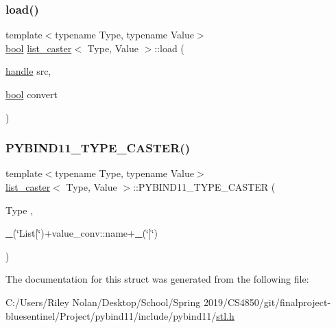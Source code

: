 \mbox{\label{structlist__caster_a6f4b4e4679fc465e40ef9f45480c3467}} 
\subsubsection{\texorpdfstring{load()}{load()}}
{\footnotesize\ttfamily template$<$typename Type, typename Value$>$ \\
\mbox{\hyperlink{asdl_8h_af6a258d8f3ee5206d682d799316314b1}{bool}} \mbox{\hyperlink{structlist__caster}{list\+\_\+caster}}$<$ Type, Value $>$\+::load (\begin{DoxyParamCaption}\item[{\mbox{\hyperlink{classhandle}{handle}}}]{src,  }\item[{\mbox{\hyperlink{asdl_8h_af6a258d8f3ee5206d682d799316314b1}{bool}}}]{convert }\end{DoxyParamCaption})\hspace{0.3cm}{\ttfamily [inline]}}

\mbox{\label{structlist__caster_a88389469e8b23995d7834cc6715ce790}} 
\subsubsection{\texorpdfstring{PYBIND11\_TYPE\_CASTER()}{PYBIND11\_TYPE\_CASTER()}}
{\footnotesize\ttfamily template$<$typename Type, typename Value$>$ \\
\mbox{\hyperlink{structlist__caster}{list\+\_\+caster}}$<$ Type, Value $>$\+::P\+Y\+B\+I\+N\+D11\+\_\+\+T\+Y\+P\+E\+\_\+\+C\+A\+S\+T\+ER (\begin{DoxyParamCaption}\item[{Type}]{,  }\item[{\mbox{\hyperlink{descr_8h_af114703e20c6527e87163eb2798f74b8}{\+\_\+}}(\char`\"{}List\mbox{[}\char`\"{})+value\+\_\+conv\+::name+\mbox{\hyperlink{descr_8h_af114703e20c6527e87163eb2798f74b8}{\+\_\+}}(\char`\"{}\mbox{]}\char`\"{})}]{ }\end{DoxyParamCaption})}



The documentation for this struct was generated from the following file\+:\begin{DoxyCompactItemize}
\item 
C\+:/\+Users/\+Riley Nolan/\+Desktop/\+School/\+Spring 2019/\+C\+S4850/git/finalproject-\/bluesentinel/\+Project/pybind11/include/pybind11/\mbox{\hyperlink{stl_8h}{stl.\+h}}\end{DoxyCompactItemize}
